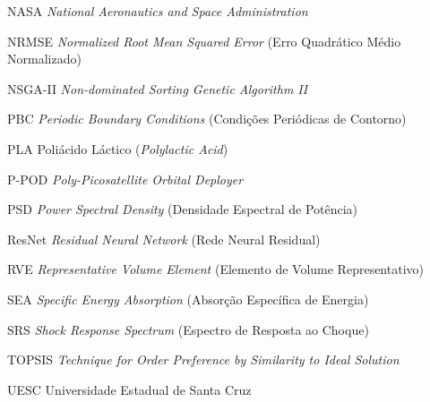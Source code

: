 \begin{siglas}
  \item[NASA] \textit{National Aeronautics and Space Administration}
  \item[NRMSE] \textit{Normalized Root Mean Squared Error} (Erro Quadrático Médio Normalizado)
  \item[NSGA-II] \textit{Non-dominated Sorting Genetic Algorithm II}
  \item[PBC] \textit{Periodic Boundary Conditions} (Condições Periódicas de Contorno)
  \item[PLA] Poliácido Láctico (\textit{Polylactic Acid})
  \item[P-POD] \textit{Poly-Picosatellite Orbital Deployer}
  \item[PSD] \textit{Power Spectral Density} (Densidade Espectral de Potência)
  \item[ResNet] \textit{Residual Neural Network} (Rede Neural Residual)
  \item[RVE] \textit{Representative Volume Element} (Elemento de Volume Representativo)
  \item[SEA] \textit{Specific Energy Absorption} (Absorção Específica de Energia)
  \item[SRS] \textit{Shock Response Spectrum} (Espectro de Resposta ao Choque)
  \item[TOPSIS] \textit{Technique for Order Preference by Similarity to Ideal Solution}
  \item[UESC] Universidade Estadual de Santa Cruz
\end{siglas}
